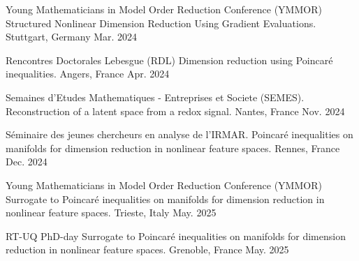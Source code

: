 \begin{cvpresentations}
\cvpresentation
{Young Mathematicians in Model Order Reduction Conference (YMMOR)} %
{Structured Nonlinear Dimension Reduction Using Gradient Evaluations.} %
{Stuttgart, Germany} %
{Mar. 2024} %


\cvpresentation
{Rencontres Doctorales Lebesgue (RDL)} %
{Dimension reduction using Poincaré inequalities.} %
{Angers, France} %
{Apr. 2024} %


\cvpresentation
{Semaines d'Etudes Mathematiques - Entreprises et Societe (SEMES).} %
{Reconstruction of a latent space from a redox signal.} %
{Nantes, France} %
{Nov. 2024} %


\cvpresentation
{S\'eminaire des jeunes chercheurs en analyse de l'IRMAR.} %
{Poincaré inequalities on manifolds for dimension reduction in nonlinear feature spaces.} %
{Rennes, France} %
{Dec. 2024} %


\cvpresentation
{Young Mathematicians in Model Order Reduction Conference (YMMOR)} %
{Surrogate to Poincaré inequalities on manifolds for dimension reduction in nonlinear feature spaces.} %
{Trieste, Italy} %
{May. 2025} %


\cvpresentation
{RT-UQ PhD-day} %
{Surrogate to Poincaré inequalities on manifolds for dimension reduction in nonlinear feature spaces.} %
{Grenoble, France} %
{May. 2025} %


\end{cvpresentations}


